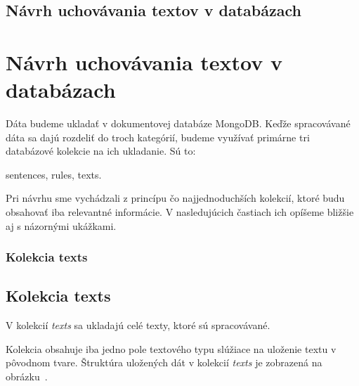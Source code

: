 %
%
{
	\subsection{Návrh uchovávania textov v databázach}
}
{
	\section{Návrh uchovávania textov v databázach}
}
\label{subsection:our_design_persisting_data}
Dáta budeme ukladať v dokumentovej databáze MongoDB. Keďže spracovávané dáta sa dajú rozdeliť do troch kategórií, budeme využívať primárne tri databázové kolekcie na ich ukladanie. Sú to:

\begin{my_itemize}
	\myitem sentences,
	\myitem rules,
	\myitem texts.
\end{my_itemize}
	
Pri návrhu sme vychádzali z princípu čo najjednoduchších kolekcií, ktoré budu obsahovať iba relevantné informácie.
V nasledujúcich častiach ich opíšeme bližšie aj s názornými ukážkami.

%
%
{
	\subsubsection{Kolekcia texts}
}
{
	\subsection{Kolekcia texts}
}
V kolekcií \textit{texts} sa ukladajú celé texty, ktoré sú spracovávané. 

Kolekcia obsahuje iba jedno pole textového typu slúžiace na uloženie textu v pôvodnom tvare. Štruktúra uložených dát v kolekcií \textit{texts} je zobrazená na obrázku~.

